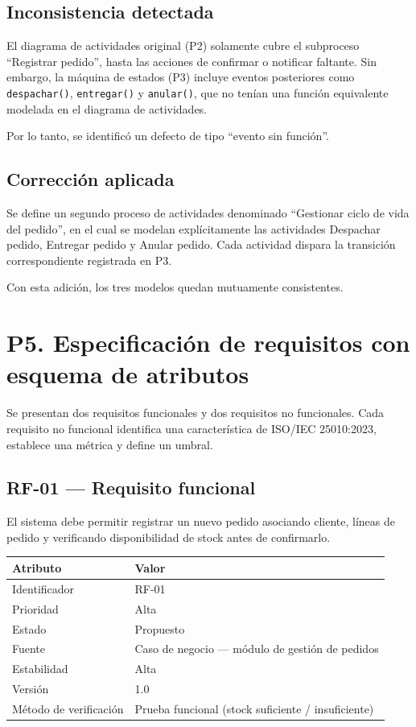 \documentclass[12pt,a4paper]{article}
\begin{document}
\subsection*{Inconsistencia detectada}

El diagrama de actividades original (P2) solamente cubre el subproceso ``Registrar pedido'', hasta las acciones de confirmar o notificar faltante. Sin embargo, la máquina de estados (P3) incluye eventos posteriores como \texttt{despachar()}, \texttt{entregar()} y \texttt{anular()}, que no tenían una función equivalente modelada en el diagrama de actividades.

Por lo tanto, se identificó un defecto de tipo ``evento sin función''.

\subsection*{Corrección aplicada}

Se define un segundo proceso de actividades denominado ``Gestionar ciclo de vida del pedido'', en el cual se modelan explícitamente las actividades Despachar pedido, Entregar pedido y Anular pedido. Cada actividad dispara la transición correspondiente registrada en P3.

Con esta adición, los tres modelos quedan mutuamente consistentes.


\section{P5. Especificación de requisitos con esquema de atributos}

Se presentan dos requisitos funcionales y dos requisitos no funcionales. Cada requisito no funcional identifica una característica de ISO/IEC 25010:2023, establece una métrica y define un umbral.

\subsection{RF-01 — Requisito funcional}

El sistema debe permitir registrar un nuevo pedido asociando cliente, líneas de pedido y verificando disponibilidad de stock antes de confirmarlo.

\begin{longtable}{p{5cm}p{9cm}}
\toprule
\textbf{Atributo} & \textbf{Valor} \\
\midrule
Identificador & RF-01 \\
Prioridad & Alta \\
Estado & Propuesto \\
Fuente & Caso de negocio — módulo de gestión de pedidos \\
Estabilidad & Alta \\
Versión & 1.0 \\
Método de verificación & Prueba funcional (stock suficiente / insuficiente) \\
\bottomrule
\end{longtable}
\end{document}
